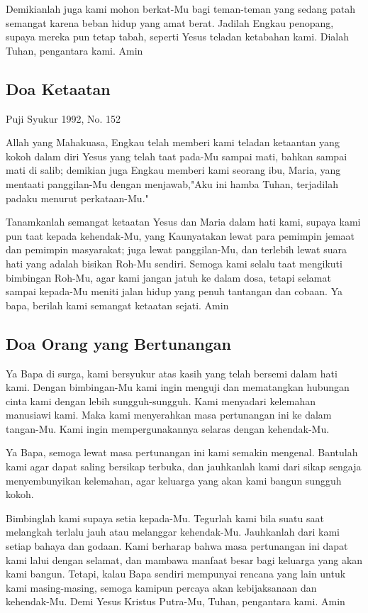 \documentclass[titlepage,11pt,openany]{scrbook}
\newcommand{\ps}[2][\numexpr\value{subsection}+1\relax]{%
\setcounter{subsection}{\numexpr#1-1\relax}
\subsection{#2}
}
\begin{document}
Demikianlah juga kami mohon berkat-Mu bagi teman-teman yang sedang patah semangat karena beban hidup yang amat berat. Jadilah Engkau penopang, supaya mereka pun tetap tabah, seperti Yesus teladan ketabahan kami. Dialah Tuhan, pengantara kami. Amin

 

\ps[152]{Doa Ketaatan}
Puji Syukur 1992, No. 152

Allah yang Mahakuasa, Engkau telah memberi kami teladan ketaantan yang kokoh dalam diri Yesus yang telah taat pada-Mu sampai mati, bahkan sampai mati di salib; demikian juga Engkau memberi kami seorang ibu, Maria, yang mentaati panggilan-Mu dengan menjawab,"Aku ini hamba Tuhan, terjadilah padaku menurut perkataan-Mu."

Tanamkanlah semangat ketaatan Yesus dan Maria dalam hati kami, supaya kami pun taat kepada kehendak-Mu, yang Kaunyatakan lewat para pemimpin jemaat dan pemimpin masyarakat; juga lewat panggilan-Mu, dan terlebih lewat suara hati yang adalah bisikan Roh-Mu sendiri. Semoga kami selalu taat mengikuti bimbingan Roh-Mu, agar kami jangan jatuh ke dalam dosa, tetapi selamat sampai kepada-Mu meniti jalan hidup yang penuh tantangan dan cobaan. Ya bapa, berilah kami semangat ketaatan sejati. Amin




\ps[155]{Doa Orang yang Bertunangan}

Ya Bapa di surga, kami bersyukur atas kasih yang telah bersemi dalam hati kami. Dengan bimbingan-Mu kami ingin menguji dan mematangkan hubungan cinta kami dengan lebih sungguh-sungguh. Kami menyadari kelemahan manusiawi kami. Maka kami menyerahkan masa pertunangan ini ke dalam tangan-Mu. Kami ingin mempergunakannya selaras dengan kehendak-Mu.

Ya Bapa, semoga lewat masa pertunangan ini kami semakin mengenal. Bantulah kami agar dapat saling bersikap terbuka, dan jauhkanlah kami dari sikap sengaja menyembunyikan kelemahan, agar keluarga yang akan kami bangun sungguh kokoh.

Bimbinglah kami supaya setia kepada-Mu. Tegurlah kami bila suatu saat melangkah terlalu jauh atau melanggar kehendak-Mu. Jauhkanlah dari kami setiap bahaya dan godaan. Kami berharap bahwa masa pertunangan ini dapat kami lalui dengan selamat, dan mambawa manfaat besar bagi keluarga yang akan kami bangun. Tetapi, kalau Bapa sendiri mempunyai rencana yang lain untuk kami masing-masing, semoga kamipun percaya akan kebijaksanaan dan kehendak-Mu. Demi Yesus Kristus Putra-Mu, Tuhan, pengantara kami. Amin
\end{document}
